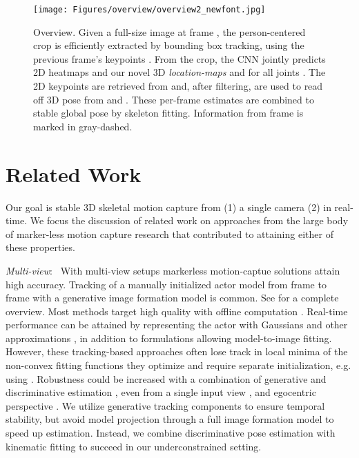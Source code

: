 \documentclass[acmtog]{acmart}
\newcommand{\parahead}[1]{\vspace{5pt}\noindent\emph{#1}:\ }
\newcommand{\change}[1]{{#1}}
\begin{document}
\begin{figure*}[t]
\texttt{[image: Figures/overview/overview2\_newfont.jpg]}
\caption{Overview. Given a full-size image  at frame , the person-centered crop  is efficiently extracted by bounding box tracking, using the previous frame's keypoints . From the crop, the CNN jointly predicts 2D heatmaps  and our novel 3D \textit{location-maps}  and  for all joints .
The 2D keypoints  are retrieved from  and, after filtering, are used to read off 3D pose   from  and .
These per-frame estimates are combined to stable global pose  by skeleton fitting. Information from frame  is marked in gray-dashed.}
   \label{fig:overview}
\end{figure*}


\section{Related Work}
Our goal is stable 3D skeletal motion capture from (1) a single camera (2) in real-time. We focus the discussion of related work on approaches from the large body of marker-less motion capture research that contributed to attaining either of these properties.

\parahead{Multi-view}
With multi-view setups markerless motion-captue solutions attain high accuracy.
Tracking of a manually initialized actor model from frame to frame with a generative image formation \change{model} is common. 
See \cite{moeslund_survey_2006} for a complete overview.
Most methods target high quality with offline computation   \cite{bregler1998tracking,howe1999bayesian,sidenbladh2000stochastic,starck_model_iccv2003,loper2014opendr}.
Real-time performance can be attained by representing the actor with Gaussians \cite{wren_pfinder_pami1997,stoll_fast_iccv2011,rhodin_versatile_iccv2015} and other approximations \cite{ma2014realtime}, in addition to formulations allowing model-to-image fitting.
However, these tracking-based approaches often lose track in local minima of the non-convex fitting functions they optimize
and require separate initialization, e.g. using \cite{sminchisescu_covariance_cvpr2001,bogo_smpl_eccv16,rhodin_general_eccv16}.
Robustness could be increased with a combination of generative and discriminative estimation \cite{elhayek_convmocap_TPAMI2016}, even from a single input view \cite{sminchisescu_learning_cvpr2006,rosales2006combining}, and egocentric perspective \cite{rhodin_egocap_SIGGRAPHAsia2016}.
We utilize generative tracking components to ensure temporal stability, but avoid model projection through a full image formation model to speed up estimation.
Instead, we combine discriminative pose estimation with kinematic fitting to succeed in our underconstrained setting.
\end{document}
